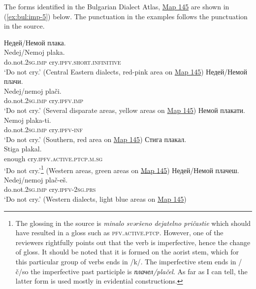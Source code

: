 \documentclass[output=paper,colorlinks=true, citecolor=brown]{langscibook}
\begin{document}
The forms identified in the Bulgarian Dialect Atlas, \href{https://ibl.bas.bg/lib/bda4/#page/171/mode/1up}{Map 145} \citep{Map145} are shown in (\ref{ex:bul:imp-5}) below. The punctuation in the examples follows the punctuation in the source. 

\ea\label{ex:bul:imp-5} 
  \ea Недей/Немой плака.\label{ex:bul:imp-5a}\\
  	\gll Nedej/Nemoj plaka.\\
        do.not.\textsc{2sg.imp} cry.\textsc{ipfv}.\textsc{short.infinitive}\\
    \glt `Do not cry.' (Central Eastern dialects, red-pink area on \href{https://ibl.bas.bg/lib/bda4/#page/171/mode/1up}{Map 145})
  \ex Недей/Немой плачи.\label{ex:bul:imp-5b}\\
	\gll Nedej/nemoj plači.\\
        do.not.\textsc{2sg.imp} cry.\textsc{ipfv}.\textsc{imp}\\
    \glt `Do not cry.' (Several disparate areas, yellow areas on \href{https://ibl.bas.bg/lib/bda4/#page/171/mode/1up}{Map 145})
  \ex Немой плакати.\label{ex:bul:imp-6a}\\ 
  	\gll Nemoj plaka-ti.\\
        do.not.\textsc{2sg.imp} cry.\textsc{ipfv}-\textsc{inf}\\
    \glt `Do not cry.' (Southern, red area on \href{https://ibl.bas.bg/lib/bda4/#page/171/mode/1up}{Map 145})
  \ex Стига плакал.\label{ex:bul:imp-6b}\\
	\gll Stiga plakal.\\
        enough cry.\textsc{ipfv}.\textsc{active.ptcp.m.sg}\\
    \glt `Do not cry.'\footnote{The glossing in the source is \textit{minalo svǝršeno dejatelno pričastie} which should have resulted in a gloss such as \textsc{pfv.active.ptcp}. However, one of the reviewers rightfully points out that the verb is imperfective, hence the change of gloss. It should be noted that it is formed on the aorist stem, which for this particular group of verbs ends in \slash k\slash. The imperfective stem ends in \slash č\slash so the imperfective past participle is \textit{плачел\slash plačel}. As far as I can tell, the latter form is used mostly in evidential constructions.} (Western areas, green areas on \href{https://ibl.bas.bg/lib/bda4/#page/171/mode/1up}{Map 145})
  \ex Недей/Немой плачеш.\label{ex:bul:imp-6c}\\
	\gll Nedej/nemoj plač-eš.\\
 do.not.\textsc{2sg.imp} cry.\textsc{ipfv}-\textsc{2sg.prs}\\
    \glt `Do not cry.' (Western dialects, light blue areas on \href{https://ibl.bas.bg/lib/bda4/#page/171/mode/1up}{Map 145})
  \z 
\z
\end{document}
